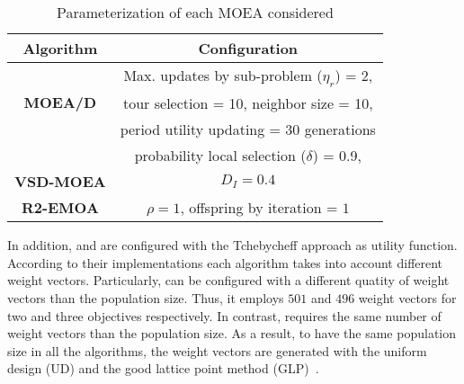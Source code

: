 %
%
%
%
%
%
%

%
\begin{table}[t]
\centering
\caption{Parameterization of each MOEA considered}
\label{tab:Parametrization}
\begin{tabular}{c|c}
\hline
\textbf{Algorithm} & \textbf{Configuration} \\ \hline
\multirow{3}{*}{\textbf{MOEA/D}} &Max. updates by sub-problem ($\eta_r$) = 2, \\
 & tour selection = 10,   neighbor size = 10, \\
 & period utility updating = 30 generations \\ 
 & probability local selection ($\delta$) = 0.9,\\ \hline
\textbf{VSD-MOEA} & $D_I=0.4$ \\ \hline
\textbf{R2-EMOA} & $\rho=1$, offspring by iteration = $1$ \\ \hline
\end{tabular}
\end{table}


%

In addition, \MOEAD{} and \RMOEA{} are configured with the Tchebycheff approach as utility function.
%
According to their implementations each algorithm takes into account different weight vectors.
%
Particularly, \RMOEA{} can be configured with a different quatity of weight vectors than the population size.
%
Thus, it employs $501$ and $496$ weight vectors for two and three objectives respectively.
%
In contrast, \MOEAD{} requires the same number of weight vectors than the population size.
%
As a result, to have the same population size in all the algorithms, the weight vectors are generated with the uniform design (UD) and the good lattice point method (GLP)~\cite{Joel:MOEAD_Uniform_Design, Joel:Kuhn_Munkres}.

